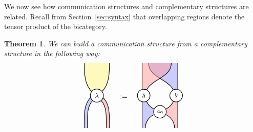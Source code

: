 \documentclass[a4paper,12pt]{article}
\newtheorem{theorem}{Theorem}[section]
\theoremstyle{definition}
\renewcommand{\-}[0]{\nobreakdash-\hspace{0pt}}
\def\fillA{blue!40}
\def\fillB{red!40}
\def\fillD{yellow!50}
\def\sideangle{30}
\def\nwangle{180-\sideangle}
\def\neangle{\sideangle}
\def\swangle{180+\sideangle}
\def\seangle{-\sideangle}
\begin{document}
\noindent
We now see how communication structures and complementary structures are related. Recall from Section~\ref{sec:syntax} that overlapping regions denote the tensor product of the bicategory.

\begin{theorem}
\label{thm:commfromcomp}
We can build a communication structure from a complementary structure in the following way:
\begin{equation*}
\begin{aligned}
\begin{tikzpicture} [thick, scale=0.8, fill opacity=0.5]
\draw [fill=\fillD, draw=none, fill opacity=0.5](0.78,2)
to [out=down, in=\neangle](0,0)
to [out=\nwangle, in=down](-0.78, 2);
\draw (0.78,2)
to [out=down, in=\neangle](0,0)
to [out=\nwangle, in=down](-0.78, 2);
\draw [fill=\fillB, draw=none] (0.78,-2)
to [out=up, in=\seangle](0.1,0.1)
to (0, -0.1)
to [out=\seangle, in=up](0.58, -2);
\draw (0.78,-2)
to [out=up, in=\seangle](0.1,0.1)
to (0, -0.1)
to [out=\seangle, in=up](0.58, -2);
\draw [fill=\fillA, draw=none] (-0.78,-2)
to [out=up, in=\swangle](-0.1,0.1)
to (0, -0.1)
to [out=\swangle, in=up](-0.58, -2);
\draw (-0.78,-2)
to [out=up, in=\swangle](-0.1,0.1)
to (0, -0.1)
to [out=\swangle, in=up](-0.58, -2);
\node [draw, fill=white, shape=circle, fill opacity=1]
 at (0, 0) {$\lambda$};
\end{tikzpicture}
\end{aligned}
\quad:=\quad
\begin{aligned}
\begin{tikzpicture} [thick, scale=0.8, fill opacity=0.5]
\draw [fill=\fillA, draw=none, fill opacity=0.5]
(-0.9, -4.5)
to [out=up, in=left](0,-3.6)
to (0, -3.4)
to [out=left, in=down](-0.9, -2.5)
to (-1.1, -2.5)
to (-1.1, -4.5);
\draw (-0.9, -4.5)
to [out=up, in=left](0,-3.6)
to (0, -3.4)
to [out=left, in=down](-0.9, -2.5)
to (-1.1, -2.5)
to (-1.1, -4.5);
\draw [fill=\fillA, draw=none]
(1.1, -0.5)
to (1.1, -2.5)
to (0.9, -2.5)
to [out=up, in=down](-0.7, -0.5);
\draw (1.1, -0.5)
to (1.1, -2.5)
to (0.9, -2.5)
to [out=up, in=down](-0.7, -0.5);
\draw [fill=\fillB, draw=none]
(-1.1, -0.5)
to (-1.1, -2.5)
to (-0.9, -2.5)
to [out=up, in=down](0.7, -0.5);
\draw (-1.1, -0.5)
to (-1.1, -2.5)
to (-0.9, -2.5)
to [out=up, in=down](0.7, -0.5);
\draw [fill=\fillB, draw=none]
(0.9, -4.5)
to [out=up, in=right](0,-3.6)
to (0, -3.4)
to [out=right, in=down](0.9, -2.5)
to (1.1, -2.5)
to (1.1, -4.5);
\draw (0.9, -4.5)
to [out=up, in=right](0,-3.6)
to (0, -3.4)
to [out=right, in=down](0.9, -2.5)
to (1.1, -2.5)
to (1.1, -4.5);
\node [draw, fill=white, fill opacity=1, shape=circle, rotate=-80]
 at (0, -3.5) {$\delta$};
 \node [draw, fill=white, fill opacity=1, shape=circle, rotate=10]
 at (-1, -2.5) {$\delta$};
  \node [draw, fill=white, fill opacity=1, shape=circle, yscale=-1, rotate=10]
 at (1, -2.5) {$\delta$};
\end{tikzpicture}
\end{aligned}
\end{equation*}
\end{theorem}
\end{document}
